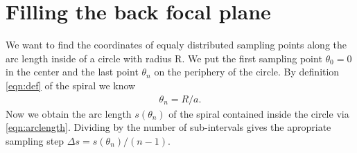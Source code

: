 \documentclass[twocolumn,DIV18]{scrartcl}
\renewcommand{\(}{\left(}
\renewcommand{\)}{\right)}
\begin{document}
\section{Filling the back focal plane}
We want to find the coordinates of equaly distributed sampling points
along the arc length inside of a circle with radius R. We put the
first sampling point $\theta_0=0$ in the center and the last point
$\theta_n$ on the periphery of the circle. By definition
\eqref{eqn:def} of the spiral we know
\begin{align}
  \theta_n=R/a.
\end{align}
Now we obtain the arc length $s(\theta_n)$ of the spiral contained
inside the circle via \eqref{eqn:arclength}. Dividing by the number of
sub-intervals gives the apropriate sampling step $\Delta s =
s(\theta_n)/(n-1)$.
\end{document}
